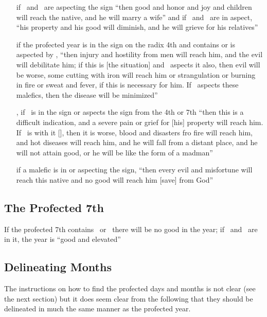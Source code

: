 \begin{itemize}[topsep=0em,itemsep=0em]
\item[\ASC]  if \Jupiter\, and \Venus\, are aspecting the sign ``then good and honor and joy and children will reach the native, and he will marry a wife'' and if \Saturn\, and \Mars\, are in aspect, ``his property and his good will diminish, and he will grieve for his relatives''


\item[\IC] if the profected year is in the sign on the radix 4th and contains or is aspected by \Saturn, ``then injury and hostility from men will reach him, and the evil will debilitate him; if this is [the situation] and \Mars\, aspects it also, then evil will be worse, some cutting with iron will reach him or strangulation or burning in fire or sweat and fever, if this is necessary for him. If \Jupiter\, aspects these malefics, then the disease will be minimized''

\item[\IC,\DSC] if \Saturn\, is in the sign or aspects the sign from the 4th or 7th  ``then this is a difficult indication, and a severe pain or grief for [his] property will reach him. If \Mars\, is with it [\Saturn], then it is worse, blood and disasters fro fire will reach him, and hot diseases will reach him, and he will fall from a distant place, and he will not attain good, or he will be like the form of a madman''

\item[\MC]  if a malefic is in or aspecting the sign, ``then every evil and misfortune will reach this native and no good will reach him [save] from God''
\end{itemize}

\subsection{The Profected 7th}
If the profected 7th contains \Saturn\, or \Mars\, there will be no good in the year; if \Jupiter\, and \Venus\, are in it, the year is ``good and elevated''

\subsection{Delineating Months}
The instructions on how to find the profected days and months is not clear (see the next section) but it does seem clear from the following that they should be delineated in much the same manner as the profected year. 

